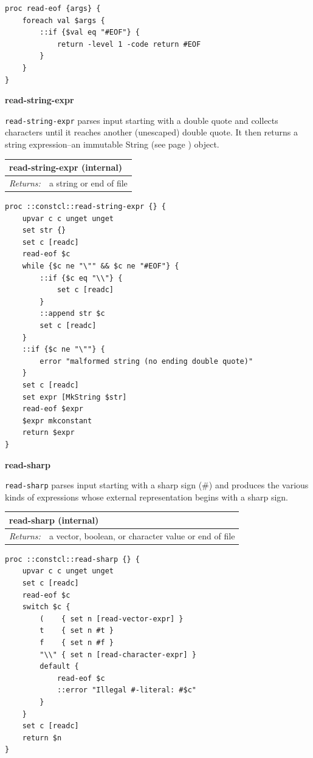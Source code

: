 \documentclass[twoside,9pt]{report}
\begin{document}
\noindent\makebox[\linewidth]{\rule{\linewidth}{0.4pt}}
\begin{lstlisting}
proc read-eof {args} {
    foreach val $args {
        ::if {$val eq "#EOF"} {
            return -level 1 -code return #EOF
        }
    }
}
\end{lstlisting}
\noindent\makebox[\linewidth]{\rule{\linewidth}{0.4pt}}

\textbf{read-string-expr}


\texttt{read-string-expr} parses input starting with a double quote and collects characters until it reaches another (unescaped) double quote. It then returns a string expression--an immutable String (see page \pageref{strings}) object.

\begin{tabular}{ |l l| }
\hline
\multicolumn{2}{|l|}{read-string-expr (internal)} \\
\hline
\textit{Returns:} & a string or end of file \\
\hline
\end{tabular}

\noindent\makebox[\linewidth]{\rule{\linewidth}{0.4pt}}
\begin{lstlisting}
proc ::constcl::read-string-expr {} {
    upvar c c unget unget
    set str {}
    set c [readc]
    read-eof $c
    while {$c ne "\"" && $c ne "#EOF"} {
        ::if {$c eq "\\"} {
            set c [readc]
        }
        ::append str $c
        set c [readc]
    }
    ::if {$c ne "\""} {
        error "malformed string (no ending double quote)"
    }
    set c [readc]
    set expr [MkString $str]
    read-eof $expr
    $expr mkconstant
    return $expr
}
\end{lstlisting}
\noindent\makebox[\linewidth]{\rule{\linewidth}{0.4pt}}

\textbf{read-sharp}


\texttt{read-sharp} parses input starting with a sharp sign (\#) and produces the various kinds of expressions whose external representation begins with a sharp sign.

\begin{tabular}{ |l l| }
\hline
\multicolumn{2}{|l|}{read-sharp (internal)} \\
\hline
\textit{Returns:} & a vector, boolean, or character value or end of file \\
\hline
\end{tabular}

\noindent\makebox[\linewidth]{\rule{\linewidth}{0.4pt}}
\begin{lstlisting}
proc ::constcl::read-sharp {} {
    upvar c c unget unget
    set c [readc]
    read-eof $c
    switch $c {
        (    { set n [read-vector-expr] }
        t    { set n #t }
        f    { set n #f }
        "\\" { set n [read-character-expr] }
        default {
            read-eof $c
            ::error "Illegal #-literal: #$c"
        }
    }
    set c [readc]
    return $n
}
\end{lstlisting}
\noindent\makebox[\linewidth]{\rule{\linewidth}{0.4pt}}
\end{document}
